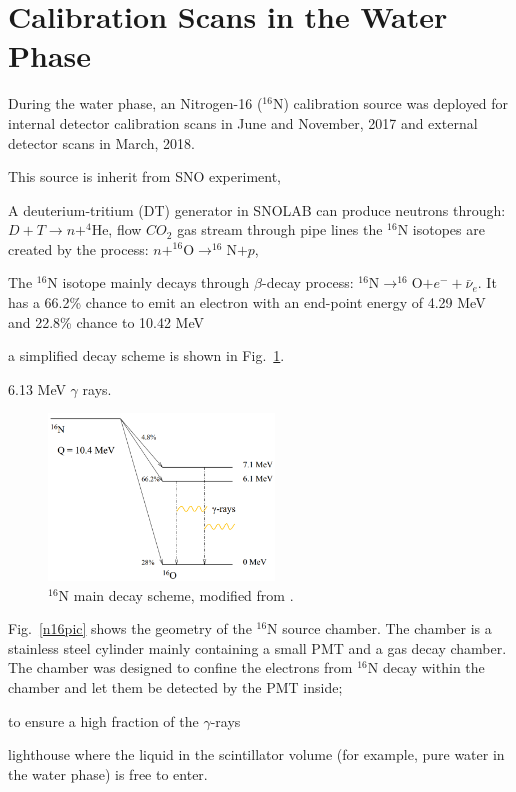 \section{ Calibration Scans in the Water Phase}
During the water phase, an Nitrogen-16 ($^{16}$N) calibration source was deployed for internal detector calibration scans in June and November, 2017 and external detector scans in March, 2018. 

This source is inherit from SNO experiment\cite{dragowsky1999sudbury,dragowsky200216n,hamer2001energy}, 

A deuterium-tritium (DT) generator in SNOLAB can produce neutrons through: $D+T\to n+^{4}$He, 
flow $CO_2$ gas stream through pipe lines
the $^{16}$N isotopes are created by the process: $n+^{16}$O$\to^{16}$N$+p$,


The $^{16}$N isotope mainly decays through $\beta$-decay process: $^{16}$N$\to ^{16}$O$+e^-+\bar{\nu}_e$.
It has a 66.2\% chance to emit an electron with an end-point energy of 4.29 MeV and 22.8\% chance to 
10.42 MeV

\cite{nndc}

a simplified decay scheme is shown in Fig.~\ref{n16decay}.

6.13 MeV $\gamma$ rays.
\begin{figure}[!htb]
	\centering
	\includegraphics[width=6cm]{n16_decay.png}
	\caption{$^{16}$N main decay scheme, modified from \cite{dragowsky200216n}.}
	\label{n16decay}
\end{figure}


Fig.~\ref{n16pic} shows the geometry of the $^{16}$N source chamber. The chamber is a stainless steel cylinder mainly containing a small PMT and a gas decay chamber. The chamber was designed to confine the electrons from $^{16}$N decay within the chamber and let them be detected by the PMT inside; 


to ensure a high fraction of the $\gamma$-rays 


lighthouse where the liquid in the scintillator volume (for example, pure water in the water phase) is free to enter.


